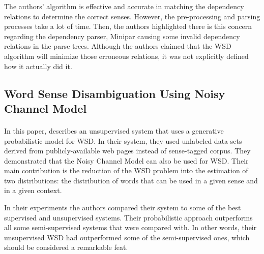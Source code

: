 \documentclass[a4paper,12pt]{nurop}
\begin{document}
The authors' algorithm is effective and accurate in matching the dependency relations to determine the correct senses. However, the pre-processing and parsing processes take a lot of time. Then, the authors highlighted there is this concern regarding the dependency parser, Minipar causing some invalid dependency relations in the parse trees. Although the authors claimed that the WSD algorithm will minimize those erroneous relations, it was not explicitly defined how it actually did it.

\subsection{Word Sense Disambiguation Using Noisy Channel Model}
\paragraph{}
In this paper, \cite{noisychannel} describes an unsupervised system that uses a generative probabilistic model for WSD. In their system, they used unlabeled data sets derived from publicly-available web pages instead of sense-tagged corpus. They demonstrated that the Noisy Channel Model can also be used for WSD. Their main contribution is the reduction of the WSD problem into the estimation of two distributions: the distribution of words that can be used in a given sense and in a given context.




In their experiments the authors compared their system to some of the best supervised and unsupervised systems. Their probabilistic approach outperforms all some semi-supervised systems that were compared with. In other words, their unsupervised WSD had outperformed some of the semi-supervised ones, which should be considered a remarkable feat.
\end{document}
